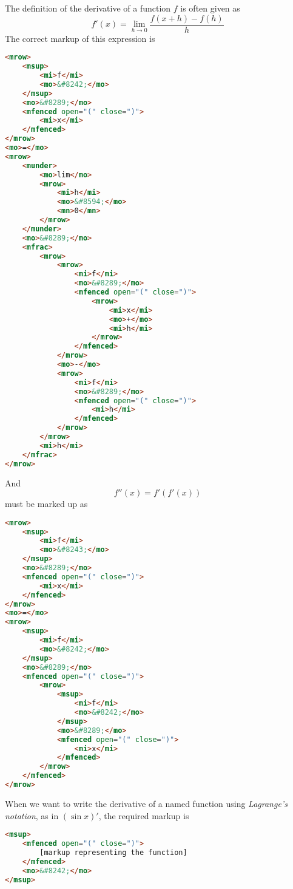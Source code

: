 \documentclass[english,a4paper,11pt]{article}
\begin{document}
\begin{eksempler}
The definition of the derivative of a function $f$ is often given as
\begin{equation}
f'(x) = \lim_{h \rightarrow 0} \frac{f(x+h) - f(h)}{h}
\end{equation}
The correct markup of this expression is 
\begin{lstlisting}[language=HTML]
<mrow>
	<msup>
		<mi>f</mi>
		<mo>&#8242;</mo>
	</msup>
	<mo>&#8289;</mo>
	<mfenced open="(" close=")">
		<mi>x</mi>
	</mfenced>
</mrow>
<mo>=</mo>
<mrow>
	<munder>
		<mo>lim</mo>
		<mrow>
			<mi>h</mi>
			<mo>&#8594;</mo>
			<mn>0</mn>
		</mrow>
	</munder>
	<mo>&#8289;</mo>
	<mfrac>
		<mrow>
			<mrow>
				<mi>f</mi>
				<mo>&#8289;</mo>
				<mfenced open="(" close=")">
					<mrow>
						<mi>x</mi>
						<mo>+</mo>
						<mi>h</mi>
					</mrow>
				</mfenced>
			</mrow>
			<mo>-</mo>
			<mrow>
				<mi>f</mi>
				<mo>&#8289;</mo>
				<mfenced open="(" close=")">
					<mi>h</mi>
				</mfenced>
			</mrow>
		</mrow>
		<mi>h</mi>
	</mfrac>
</mrow>
\end{lstlisting}
And
\begin{equation}
f''(x) = f'(f'(x))
\end{equation}
must be marked up as
\begin{lstlisting}[language=HTML]
<mrow>
	<msup>
		<mi>f</mi>
		<mo>&#8243;</mo>
	</msup>
	<mo>&#8289;</mo>
	<mfenced open="(" close=")">
		<mi>x</mi>
	</mfenced>
</mrow>
<mo>=</mo>
<mrow>
	<msup>
		<mi>f</mi>
		<mo>&#8242;</mo>
	</msup>
	<mo>&#8289;</mo>
	<mfenced open="(" close=")">
		<mrow>
			<msup>
				<mi>f</mi>
				<mo>&#8242;</mo>
			</msup>
			<mo>&#8289;</mo>
			<mfenced open="(" close=")">
				<mi>x</mi>
			</mfenced>
		</mrow>
	</mfenced>
</mrow>
\end{lstlisting}

\end{eksempler}

\bigskip
When we want to write the derivative of a named function using \emph{Lagrange's notation}, as in $(\sin x)'$, the required markup is

\begin{lstlisting}[language=HTML]
<msup>
	<mfenced open="(" close=")">
		[markup representing the function]
	</mfenced>
	<mo>&#8242;</mo>
</msup>
\end{lstlisting}
\end{document}
